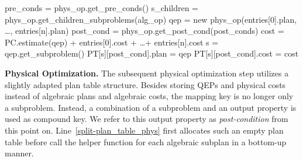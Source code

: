 \begin{algfloat}[!h]
    \centering
    \begin{algorithmic}[1]
       \State {}
          \label{physical-iterate_ops}
             \label{physical-skip_ops_begin}
                \State \Continue\label{physical-skip_ops_end}
             \EndIf
             \State pre\_conds = phys\_op.get\_pre\_conds()
             \State s\_children = phys\_op.get\_children\_subproblems(alg\_op)\label{physical-s_children}
             \State {}
             \label{physical-iterate_permutations}
             \State {}
                \label{physical-iterate_children}
                   \label{physical-skip_children_begin}
                      \State \Continue\label{physical-skip_children_end}
                   \EndIf
                   \State qep = new phys\_op(entries[0].plan, \dots, entries[n].plan)\label{physical-qep_begin}
                   \State post\_cond = phys\_op.get\_post\_cond(post\_conds)
                   \State {}
                   \State cost = PC.estimate(qep) + entries[0].cost + \dots + entries[n].cost
                   \State s = qep.get\_subproblem() 
                      \State PT[s][post\_cond].plan = qep \label{physical-qep_update}
                      \State PT[s][post\_cond].cost = cost \label{physical-qep_end}
                   \EndIf
                \EndFor
             \EndFor
          \EndFor
       \EndFunction
    \end{algorithmic}
    \caption{Pseudocode for the physical optimization.}
    \label{alg:physical}
\end{algfloat}

\textbf{Physical Optimization.}
The subsequent physical optimization step utilizes a slightly adapted plan table structure.  Besides storing QEPs and physical costs instead of algebraic plans and algebraic costs, the mapping key is no longer only a subproblem.  Instead, a combination of a subproblem and an output property is used as compound key.  We refer to this output property as \emph{post-condition} from this point on.  Line~\ref{split-plan_table_phys} first allocates such an empty plan table before  call the helper function  for each algebraic subplan in a bottom-up manner.

